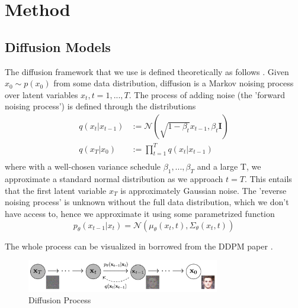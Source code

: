 \section{Method}

\subsection{Diffusion Models}
\label{sec:diffusion_models}
The diffusion framework that we use is defined theoretically as follows \cite{ddpm,improved_diffusion,EDGE}. Given $x_0 \sim p(x_0)$ from some data distribution, diffusion is a Markov noising process over latent variables $x_t, t=1,...,T$. The process of adding noise (the 'forward noising process') is defined through the distributions
\begin{equation}
    \begin{aligned}
        q(x_t|x_{t-1}) &:= \mathcal{N}(\sqrt{1-\beta_t} x_{t-1}, \beta_t \mathbf{I}) \\
        q(x_T | x_0) &:= \prod_{t=1}^T q(x_t | x_{t-1}) \\
    \end{aligned}
\end{equation}
where with a well-chosen variance schedule $\beta_1, ..., \beta_T$ and a large T, we approximate a standard normal distribution as we approach $t=T$. This entails that the first latent variable $x_T$ is approximately Gaussian noise. The 'reverse noising process' is unknown without the full data distribution, which we don't have access to, hence we approximate it using some parametrized function
\begin{equation}
    \label{eq:reverse_noising_mean_variance}
    p_{\theta}(x_{t-1} | x_t) = \mathcal{N}(\mu_{\theta}(x_t, t), \Sigma_{\theta}(x_t, t))
\end{equation}

The whole process can be visualized in  borrowed from the DDPM paper \cite{ddpm}.

\begin{figure}[!ht]
    \centering
    \includegraphics[width=0.75\textwidth]{Figures/diffusion/diffusion_process.png}
    \caption{Diffusion Process}
    \label{fig:diffusion_process}
\end{figure}

